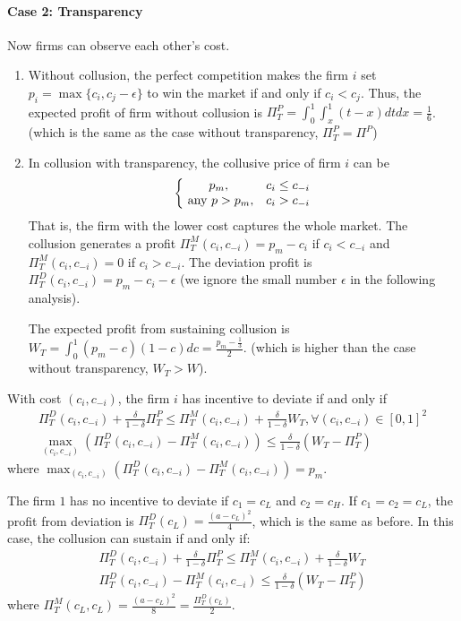 \documentclass[12pt]{article}
\begin{document}
\paragraph{Case 2: Transparency} Now firms can observe each other's cost.
\begin{enumerate}
    \item Without collusion, the perfect competition makes the firm $i$ set $p_i=\max\{c_i,c_j-\epsilon\}$ to win the market if and only if $c_i< c_j$. Thus, the expected profit of firm without collusion is $\Pi^P_T=\int_0^1 \int_x^1 (t-x) dt dx=\frac{1}{6}$. (which is the same as the case without transparency, $\Pi^P_T=\Pi^P$)
    \item In collusion with transparency, the collusive price of firm $i$ can be $$\left\{\begin{matrix}
        p_m,&c_i\leq c_{-i}\\
        \textnormal{ any }p>p_m,&c_i>c_{-i}
    \end{matrix}\right.$$ That is, the firm with the lower cost captures the whole market. The collusion generates a profit $\Pi^M_T(c_i,c_{-i})=p_m-c_i$ if $c_i< c_{-i}$ and $\Pi^M_T(c_i,c_{-i})=0$ if $c_i>c_{-i}$. The deviation profit is $\Pi^D_T(c_i,c_{-i})=p_m-c_i-\epsilon$ (we ignore the small number $\epsilon$ in the following analysis).
    
    The expected profit from sustaining collusion is $W_T=\int_0^1 (p_m-c)(1-c)dc=\frac{p_m-\frac{1}{3}}{2}$. (which is higher than the case without transparency, $W_T>W$).
\end{enumerate}

With cost $(c_i,c_{-i})$, the firm $i$ has incentive to deviate if and only if
\begin{equation}
    \begin{aligned}
        \Pi^D_T(c_i,c_{-i})+\frac{\delta}{1-\delta}\Pi^P_T\leq \Pi^M_T(c_i,c_{-i})+\frac{\delta}{1-\delta}W_T,\forall (c_i,c_{-i})\in[0,1]^2\\
        \max_{(c_i,c_{-i})}\left(\Pi^D_T(c_i,c_{-i})-\Pi^M_T(c_i,c_{-i})\right)\leq \frac{\delta}{1-\delta}\left(W_T-\Pi^P_T\right)
    \end{aligned}
    \nonumber
\end{equation}
where $\max_{(c_i,c_{-i})}\left(\Pi^D_T(c_i,c_{-i})-\Pi^M_T(c_i,c_{-i})\right)=p_m$.

The firm $1$ has no incentive to deviate if $c_1=c_L$ and $c_2=c_H$. If $c_1=c_2=c_L$, the profit from deviation is $\Pi^D_T(c_L)=\frac{(a-c_L)^2}{4}$, which is the same as before. In this case, the collusion can sustain if and only if:
\begin{equation}
    \begin{aligned}
        \Pi^D_T(c_i,c_{-i})+\frac{\delta}{1-\delta}\Pi^P_T\leq \Pi^M_T(c_i,c_{-i})+\frac{\delta}{1-\delta}W_T\\
        \Pi^D_T(c_i,c_{-i})-\Pi^M_T(c_i,c_{-i})\leq \frac{\delta}{1-\delta}(W_T-\Pi^P_T)
    \end{aligned}
    \nonumber
\end{equation}
where $\Pi^M_T(c_L,c_L)=\frac{(a-c_L)^2}{8}=\frac{\Pi^D_T(c_L)}{2}$.
\end{document}
